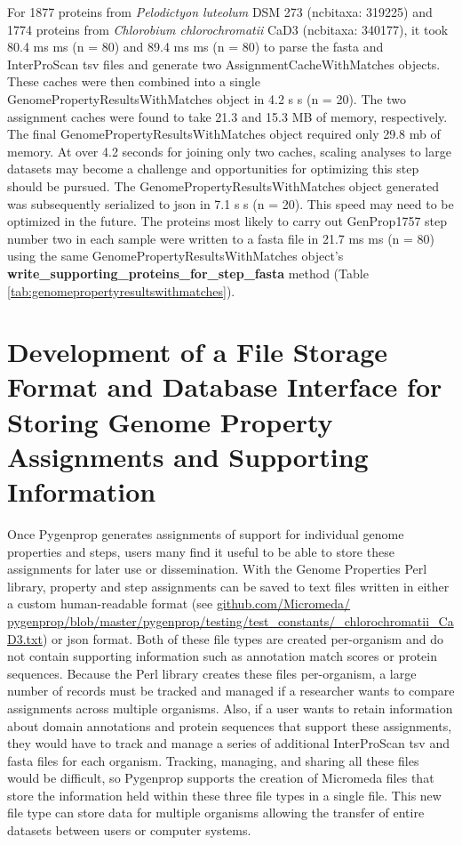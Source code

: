 For 1877 proteins from \textit{Pelodictyon luteolum} DSM 273 (\gls{ncbitaxa}: 
319225) and 1774 proteins from \textit{Chlorobium chlorochromatii} CaD3 
(\gls{ncbitaxa}: 340177), it took 80.4 ms  ms (\gls{n} = 80) and 89.4 
ms  ms (\gls{n} = 80) to parse the \gls{fasta} and InterProScan 
\gls{tsv} files and generate two AssignmentCacheWithMatches objects. These 
caches were then combined into a single GenomePropertyResultsWithMatches object 
in 4.2 s  s (\gls{n} = 20). The two assignment caches were found to 
take 21.3 and 15.3 MB of memory, respectively. The final 
GenomePropertyResultsWithMatches object required only 29.8 \gls{mb} of memory. 
At over 4.2 seconds for joining only two caches, scaling analyses to large 
datasets may become a challenge and opportunities for optimizing this step 
should be pursued. The GenomePropertyResultsWithMatches object generated was 
subsequently serialized to \gls{json} in 7.1 s  s (\gls{n} = 20). 
This speed may need to be optimized in the future. The proteins most likely to 
carry out GenProp1757 step number two in each sample were written to a 
\gls{fasta} file in 21.7 ms  ms (\gls{n} = 80) using the same 
GenomePropertyResultsWithMatches object's 
\textbf{write\_supporting\_proteins\_for\_step\_fasta} method (Table 
\ref{tab:genomepropertyresultswithmatches}).

\section{Development of a File Storage Format and Database Interface for Storing 
Genome Property Assignments and Supporting Information} \label{MicromedaFiles}

Once Pygenprop generates assignments of support for individual genome properties 
and steps, users many find it useful to be able to store these assignments for later 
use or dissemination. With the Genome Properties Perl library, property and step 
assignments can be saved to text files written in either a custom human-readable 
format (see 
\href{http://github.com/Micromeda/pygenprop/blob/master/pygenprop/testing/test_constants/C_chlorochromatii_CaD3.txt}{github.com/Micromeda/ 
pygenprop/blob/master/pygenprop/testing/test\_constants/\_chlorochromatii\_CaD3.txt}) 
or \gls{json} format. Both of these file types are created per-organism and do 
not contain supporting information such as annotation match scores or protein 
sequences. Because the Perl library creates these files per-organism, a large 
number of records must be tracked and managed if a researcher wants to compare 
assignments across multiple organisms. Also, if a user wants to retain 
information about domain annotations and protein sequences that support these 
assignments, they would have to track and manage a series of additional 
InterProScan \gls{tsv} and \gls{fasta} files for each organism. Tracking, managing, 
and sharing all these files would be difficult, so Pygenprop supports the 
creation of Micromeda files that store the information held within these three 
file types in a single file. This new file type can store data for multiple 
organisms allowing the transfer of entire datasets between users or computer 
systems.


